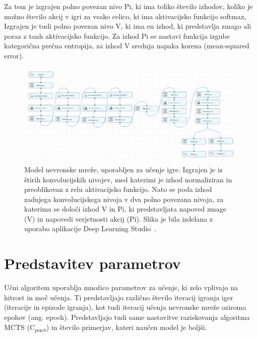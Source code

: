 \documentclass[a4paper, 12pt]{book}
\begin{document}
Za tem je izgrajen polno povezan nivo Pi, ki ima toliko število izhodov, koliko je možno število akcij v igri za vsako celico, ki ima aktivacijsko funkcijo softmax,
Izgrajen je tudi polno povezan nivo V, ki ima en izhod, ki predstavlja zmago ali poraz z tanh aktivacijsko funkcijo.
Za izhod Pi se nastavi funkcija izgube kategorična prečna entropija, za izhod V srednja napaka korena (mean-squared error).

\begin{figure}[h!]
	\begin{center}
		\includegraphics[width=1\textwidth]{photos/model_using_deepcognition.pdf}
	\end{center}
	\caption{Model nevronske mreže, uporabljen za učenje igre. Izgrajen je iz štirih konvolucijskih nivojev, med katerimi je izhod normaliziran in preoblikovan z relu aktivacijsko funkcijo. 
		Nato se poda izhod zadnjega konvolucijskega nivoja v dva polno povezana nivoja, za katerima se določi izhod V in Pi, ki predstavljata napoved zmage (V) in napovedi verjetnosti akcij (Pi).
		Slika je bila izdelana z uporabo aplikacije Deep Learning Studio~\cite{deepcognition}.}
	\label{vizualzacijaModela}
\end{figure}

\section{Predstavitev parametrov}
\label{parametri}
Učni algoritem uporablja množico parametrov za učenje, ki zelo vplivajo na hitrost in moč učenja.
Ti predstavljajo različno število iteracij igranja iger (iteracije in epizode igranja), kot tudi iteracij učenja nevronske mreže oziroma epohov (ang. epoch).
Predstavljajo tudi same nastavitve raziskovanja algoritma MCTS (C\textsubscript{puct}) in število primerjav, kateri naučen model je boljši.
\end{document}
